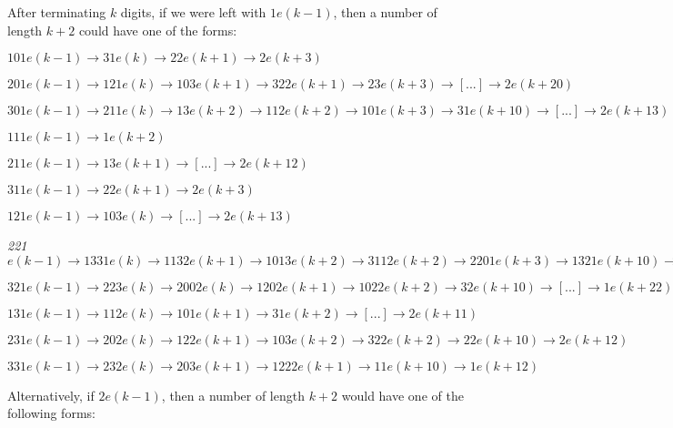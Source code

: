 \documentclass[10pt,a4paper,showpacs,nofootinbib,aps,superscriptaddress,eqsecnum,prd,showkeys,notitlepage]{article}
\begin{document}
After terminating $k$ digits, if we were left with $1e(k-1)$, then a number of length $k+2$ could have one of the forms:

$101e(k-1) \rightarrow 31e(k) \rightarrow 22e(k+1) \rightarrow 2e(k+3)$

$201e(k-1) \rightarrow 121e(k) \rightarrow 103e(k+1) \rightarrow 322e(k+1) \rightarrow 23e(k+3) \rightarrow [...] \rightarrow 2e(k+20)$

$301e(k-1) \rightarrow 211e(k) \rightarrow 13e(k+2) \rightarrow 112e(k+2) \rightarrow 101e(k+3) \rightarrow 31e(k+10) \rightarrow [...] \rightarrow 2e(k+13)$

$111e(k-1) \rightarrow 1e(k+2)$

$211e(k-1) \rightarrow 13e(k+1) \rightarrow [...] \rightarrow 2e(k+12)$

$311e(k-1) \rightarrow 22e(k+1) \rightarrow 2e(k+3)$

$121e(k-1) \rightarrow 103e(k) \rightarrow [...] \rightarrow 2e(k+13)$

\textit{221}$e(k-1) \rightarrow 1331e(k) \rightarrow 1132e(k+1) \rightarrow 1013e(k+2) \rightarrow 3112e(k+2) \rightarrow 2201e(k+3) \rightarrow 1321e(k+10) \rightarrow 1123e(k+11) \rightarrow 10102e(k+11) \rightarrow 3032e(k+12) \rightarrow 2123e(k+13) \rightarrow 13102e(k+13) \rightarrow 11132e(k+20) \rightarrow 10013e(k+21) \rightarrow 30112e(k+21) \rightarrow 21101e(k+22) \rightarrow 12331e(k+23) \rightarrow 11032e(k+30) \rightarrow 3323e(k+31) \rightarrow 23302e(k+31) \rightarrow 20312e(k+32) \rightarrow 12221e(k+33) \rightarrow 10333e(k+100) \rightarrow 32332e(k+100) \rightarrow 23033e(k+101) \rightarrow 201232e(k+101) \rightarrow 121102e(k+102) \rightarrow 102332e(k+103) \rightarrow 32032e(k+110) \rightarrow 22222e(k+111) \rightarrow 2e(k+122)$

$321e(k-1) \rightarrow 223e(k) \rightarrow 2002e(k) \rightarrow 1202e(k+1) \rightarrow 1022e(k+2) \rightarrow 32e(k+10) \rightarrow [...] \rightarrow 1e(k+22)$

$131e(k-1) \rightarrow 112e(k) \rightarrow 101e(k+1) \rightarrow 31e(k+2) \rightarrow [...] \rightarrow 2e(k+11) $

$231e(k-1) \rightarrow 202e(k) \rightarrow 122e(k+1) \rightarrow 103e(k+2) \rightarrow 322e(k+2) \rightarrow 22e(k+10) \rightarrow 2e(k+12)$

$331e(k-1) \rightarrow 232e(k) \rightarrow 203e(k+1) \rightarrow 1222e(k+1) \rightarrow 11e(k+10) \rightarrow 1e(k+12)$


\addtocounter{page}{6}
Alternatively, if $2e(k-1)$, then a number of length $k+2$ would have one of the following forms:
\end{document}

